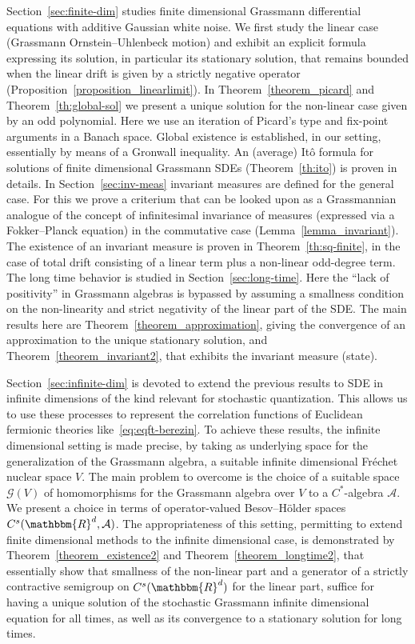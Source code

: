 \documentclass[11pt]{article}
\begin{document}
Section~\ref{sec:finite-dim} studies finite dimensional Grassmann
differential equations with additive Gaussian white noise. We first study the
linear case (Grassmann Ornstein--Uhlenbeck motion) and exhibit an explicit
formula expressing its solution, in particular its stationary solution, that
remains bounded when the linear drift is given by a strictly negative operator
(Proposition~\ref{proposition_linearlimit}). In Theorem~\ref{theorem_picard}
and Theorem~\ref{th:global-sol} we present a unique solution for the
non-linear case given by an odd polynomial. Here we use an iteration of
Picard's type and fix-point arguments in a Banach space. Global existence is
established, in our setting, essentially by means of a Gronwall inequality. An
(average) It{\^o} formula for solutions of finite dimensional Grassmann SDEs
(Theorem~\ref{th:ito}) is proven in details. In Section~\ref{sec:inv-meas}
invariant measures are defined for the general case. For this we prove a
criterium that can be looked upon as a Grassmannian analogue of the concept of
infinitesimal invariance of measures (expressed via a Fokker--Planck equation)
in the commutative case (Lemma~\ref{lemma_invariant}). The existence of an
invariant measure is proven in Theorem~\ref{th:sq-finite}, in the case of
total drift consisting of a linear term plus a non-linear odd-degree term. The
long time behavior is studied in Section~\ref{sec:long-time}. Here the ``lack
of positivity'' in Grassmann algebras is bypassed by assuming a smallness
condition on the non-linearity and strict negativity of the linear part of the
SDE. The main results here are Theorem~\ref{theorem_approximation}, giving the
convergence of an approximation to the unique stationary solution, and
Theorem~\ref{theorem_invariant2}, that exhibits the invariant measure (state).

Section~\ref{sec:infinite-dim} is devoted to extend the previous results to
SDE in infinite dimensions of the kind relevant for stochastic quantization.
This allows us to use these processes to represent the correlation functions
of Euclidean fermionic theories like~{\eqref{eq:eqft-berezin}}. To achieve
these results, the infinite dimensional setting is made precise, by taking as
underlying space for the generalization of the Grassmann algebra, a suitable
infinite dimensional Fr{\'e}chet nuclear space $V$. The main problem to
overcome is the choice of a suitable space $\mathcal{G} (V)$ of homomorphisms
for the Grassmann algebra over $V$ to a $C^{\ast}$-algebra $\mathcal{A}$. We
present a choice in terms of operator-valued Besov--H{\"o}lder spaces $C^s
(\mathbbm{R}^d, \mathcal{A})$. The appropriateness of this setting, permitting
to extend finite dimensional methods to the infinite dimensional case, is
demonstrated by Theorem~\ref{theorem_existence2} and
Theorem~\ref{theorem_longtime2}, that essentially show that smallness of the
non-linear part and a generator of a strictly contractive semigroup on $C^s
(\mathbbm{R}^d)$ for the linear part, suffice for having a unique solution of
the stochastic Grassmann infinite dimensional equation for all times, as well
as its convergence to a stationary solution for long times.
\end{document}
